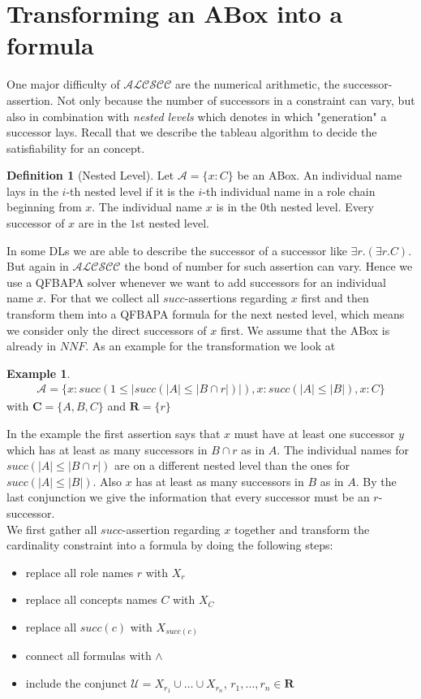\documentclass{book}
\theoremstyle{break}
\theoremstyle{definition}
\newtheorem{mydef}{Definition}
\newtheorem{ex}{Example}
\begin{document}
\section{Transforming an ABox into a formula}
One major difficulty of $\mathcal{ALCSCC}$ are the numerical arithmetic, the successor-assertion. Not only because the number of successors in a constraint can vary, but also in combination with \textit{nested levels} which denotes in which "generation" a successor lays. Recall that we describe the tableau algorithm to decide the satisfiability for an concept. 
\begin{mydef}[Nested Level]
Let $\mathcal{A}=\{x:C\}$ be an ABox. An individual name lays in the $i$-th nested level if it is the $i$-th individual name in a role chain beginning from $x$. The individual name $x$ is in the $0$th nested level. Every successor of $x$ are in the $1$st nested level. 
\end{mydef}
In some DLs we are able to describe the successor of a successor like $\exists r.(\exists r.C)$. But again in $\mathcal{ALCSCC}$ the bond of number for such assertion can vary. Hence we use a QFBAPA solver whenever we want to add successors for an individual name $x$. For that we collect all $succ$-assertions regarding $x$ first and then transform them into a QFBAPA formula for the next nested level, which means we consider only the direct successors of $x$ first. We assume that the ABox is already in $NNF$. As an example for the transformation we look at
\begin{ex}
\begin{align*}
\mathcal{A}=\{x:succ(1\leq|succ(|A|\leq|B\cap r|)|), x:succ(|A|\leq |B|), x:C\}
\end{align*}
with $\mathbf{C}=\{A,B,C\}$ and $\mathbf{R}=\{r\}$
\end{ex}
In the example the first assertion says that $x$ must have at least one successor $y$ which has at least as many successors in $B\cap r$ as in $A$. The individual names for $succ(|A|\leq|B\cap r|)$ are on a different nested level than the ones for $succ(|A|\leq |B|)$. Also $x$ has at least as many successors in $B$ as in $A$. By the last conjunction we give the information that every successor must be an $r$-successor.\\
We first gather all $succ$-assertion regarding $x$ together and transform the cardinality constraint into a formula by doing the following steps:
\begin{itemize}
\item replace all role names $r$ with $X_r$
\item replace all concepts names $C$ with $X_C$
\item replace all $succ(c)$ with $X_{succ(c)}$
\item connect all formulas with $\wedge$
\item include the conjunct $\mathcal{U}=X_{r_1}\cup\dots\cup X_{r_n}$, $r_1,\dots, r_n\in\mathbf{R}$
\end{itemize}
\end{document}
